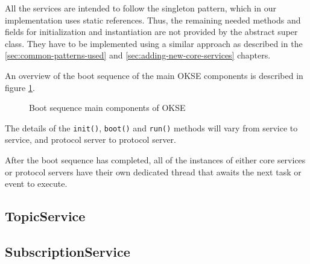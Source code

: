 All the services are intended to follow the singleton pattern, which in our implementation uses static references. Thus, the remaining needed methods and fields for initialization and instantiation are not provided by the abstract super class. They have to be implemented using a similar approach as described in the \ref{sec:common-patterns-used} and \ref{sec:adding-new-core-services} chapters.

An overview of the boot sequence of the main OKSE components is described in figure \ref{fig:boot-sequence}.


\begin{center}
  \begin{figure}[ht!]
    \caption{Boot sequence main components of OKSE}
    \label{fig:boot-sequence}
  \end{figure}
\end{center}

The details of the \verb!init()!, \verb!boot()! and \verb!run()! methods will vary from service to service, and protocol server to protocol server.

After the boot sequence has completed, all of the instances of either core services or protocol servers have their own dedicated thread that awaits the next task or event to execute.

\subsection{TopicService}

\subsection{SubscriptionService}

